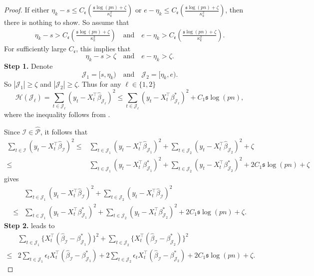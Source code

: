 \documentclass[11pt]{article}
\newcommand{\I}{{\mathcal I }}
\newcommand{\J}{{  \mathcal J } }
\newcommand{\hatp}{  {\widehat  { \mathcal P }  } }
\newcommand{\s}{ { \mathfrak{s}  } }
\theoremstyle{plain}
\theoremstyle{definition}
\begin{document}
\begin{proof}   
If either $ \eta_k -s \le  C_{\mathfrak e}  \left(\frac{ \s \log(pn)  + \zeta }{\kappa_k^2}\right)   $ or $e-\eta_k\le  C_{\mathfrak e}  \left(\frac{ \s \log(pn)  + \zeta }{\kappa_k^2}\right) $, then there is nothing to show. So assume that 
\begin{align}\label{eq:localization_error_case1_assume}
\eta_k -s  >  C_{\mathfrak e}  \left(\frac{ \s \log(pn)  + \zeta }{\kappa_k^2}\right)  \quad \text{and} \quad   e-\eta_k  >  C_{\mathfrak e}  \left(\frac{ \s \log(pn)  +  \zeta }{\kappa_k^2}\right)  .
\end{align}
For sufficiently large $ C_{\mathfrak e} $, this implies that 
$$ \eta_k-s > \zeta  \quad \text{and} \quad e - \eta_k  >  \zeta.$$
{\bf Step 1.}  Denote 
$$ \J_ 1 = [s,\eta_k) \quad \text{and} \quad \J_2 = [\eta_k, e) .$$
So $|\J_1| \ge \zeta$ and $|\J _2| \ge \zeta$. Thus 
for any $ \ell\in \{ 1, 2 \}$ 
$$ \mathcal H(\J_\ell) =\sum_{t  \in \J_\ell }(y_t  -X_t ^\top  \widehat  \beta _{\J_\ell}  ) ^2 
\le \sum_{t  \in \J_\ell  }(y_t  -X_t ^\top     \beta _{\J _\ell }^*  ) ^2 +C_1 \s\log(pn), $$
where the inequality follows from . 

  Since 
$ \I \in \hatp   $,   it follows that 
\begin{align}\nonumber
\sum_{t  \in \I }(y_t  - X_t ^\top \widehat \beta _\I  ) ^2 \le &  \sum_{t  \in \J_1 }(y_t  -X_t ^\top  \widehat  \beta _{\J _1}  ) ^2  + \sum_{t  \in \J _2 }(y_t  -X_t ^\top  \widehat \beta _{\J _2}  ) ^2    + \zeta  
\\
\le &  \sum_{t  \in \J _1 }(y_t  -X_t ^\top     \beta ^* _{\J _1}  ) ^2  + \sum_{t  \in \J _2 }(y_t  -X_t ^\top   \beta^*  _{\J _2}  ) ^2  +2C_1  \s \log(pn)    +  \zeta   
 \label{eq:one change point step 1}
\end{align}
  gives 
\begin{align}  \nonumber 
& \sum_{t  \in \J_1 }(y_t   -X_t ^\top  \widehat \beta _\I ) ^2 +\sum_{t  \in \J_2 }(y_t  - X_t ^\top  \widehat \beta _\I  ) ^2  
\\ 
 \le \label{eq:regression step 2 first term} & \sum_{t  \in \J _1  }(y_t -  X_t ^\top    \beta _{\J  _1}  ^*    ) ^2   +\sum_{t  \in \J _2  }(y_t - X_t ^\top    \beta _{\J  _2}  ^*  ) ^2  +2 C_1      \s \log(pn)  +  \zeta  .
\end{align}
{\bf Step 2.}   leads to 
\begin{align} \nonumber
&\sum_{t  \in \J  _1 } \big\{ X_t ^\top  (  \widehat \beta _\I  -  \beta^* _{\J_1 }) \big\}  ^2 +\sum_{t   \in \J _2  } \big\{ X_t  ^\top  (  \widehat \beta _\I  -  \beta^* _{\J_2 }) \big\}  ^2  
\\  \label{eq:regression one change step 2 term 2}
 \le  & 2 \sum_{ t  \in \J _1  } \epsilon_t   X_t ^\top (  \widehat \beta _\I  -  \beta^* _{\J _1 }) +  2 \sum_{ t  \in \J  _2  } \epsilon_t   X_t ^\top (  \widehat \beta _\I  -  \beta^* _{\J _2  })    + 2 C_1      \s \log(pn)  +   \zeta  .
\end{align} 


\end{proof}
\end{document}
